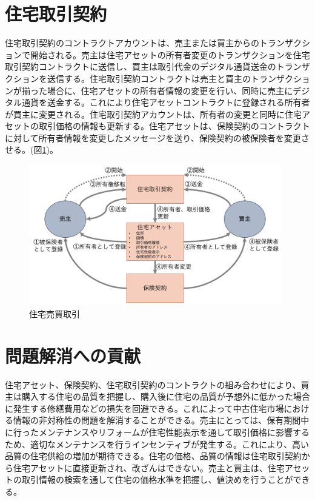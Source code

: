 \documentclass[a4paper,fontsize=11pt,report,notitlepage,line_length=38zw,number_of_lines=40,dvipdfmx]{jlreq}
\begin{document}
\section{住宅取引契約}
住宅取引契約のコントラクトアカウントは、売主または買主からのトランザクションで開始される。売主は住宅アセットの所有者変更のトランザクションを住宅取引契約コントラクトに送信し、買主は取引代金のデジタル通貨送金のトランザクションを送信する。住宅取引契約コントラクトは売主と買主のトランザクションが揃った場合に、住宅アセットの所有者情報の変更を行い、同時に売主にデジタル通貨を送金する。これにより住宅アセットコントラクトに登録される所有者が買主に変更される。住宅取引契約アカウントは、所有者の変更と同時に住宅アセットの取引価格の情報も更新する。住宅アセットは、保険契約のコントラクトに対して所有者情報を変更したメッセージを送り、保険契約の被保険者を変更させる。(図\ref{spa})。

\begin{figure}
 \centering
 \includegraphics[width=11cm]{spa.png}
 \caption{住宅売買取引}
 \label{spa}
\end{figure}

\section{問題解消への貢献}
住宅アセット、保険契約、住宅取引契約のコントラクトの組み合わせにより、買主は購入する住宅の品質を把握し、購入後に住宅の品質が予想外に低かった場合に発生する修繕費用などの損失を回避できる。これによって中古住宅市場における情報の非対称性の問題を解消することができる。売主にとっては、保有期間中に行ったメンテナンスやリフォームが住宅性能表示を通して取引価格に影響するため、適切なメンテナンスを行うインセンティブが発生する。これにより、高い品質の住宅供給の増加が期待できる。住宅の価格、品質の情報は住宅取引契約から住宅アセットに直接更新され、改ざんはできない。売主と買主は、住宅アセットの取引情報の検索を通して住宅の価格水準を把握し、値決めを行うことができる。
\end{document}
